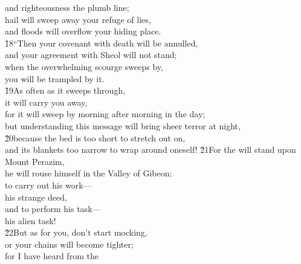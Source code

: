 \begin{poetry}
\poemll    and righteousness the plumb line; \\
\poeml hail will sweep away your refuge of lies, \\
\poemll    and floods will overflow your hiding place. \\
\poeml \v{18}``Then your covenant with death will be annulled, \\
\poemll    and your agreement with Sheol will not stand; \\
\poeml when the overwhelming scourge sweeps by, \\
\poemll    you will be trampled by it. \\
\poeml \v{19}As often as it sweeps through, \\
\poemll    it will carry you away, \\
\poeml for it will sweep by morning after morning in the day; \\
\poemll    but understanding this message will bring sheer terror at night, \\
\poeml \v{20}because the bed is too short to stretch out on, \\
\poemll    and its blankets too narrow to wrap around oneself!
\poeml \v{21}For the  will stand upon Mount Perazim, \\
\poemll    he will rouse himself in the Valley of Gibeon; \\
\poeml to carry out his work--- \\
\poemll    his strange deed, \\
\poeml and to perform his task--- \\
\poemll    his alien task! \\
\poeml \v{22}But as for you, don't start mocking, \\
\poemll    or your chains will become tighter; \\
\poeml for I have heard from the 
\end{poetry}
